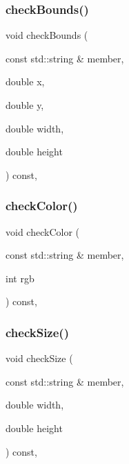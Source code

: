\subsubsection{\texorpdfstring{check\+Bounds()}{checkBounds()}}
{\footnotesize\ttfamily void check\+Bounds (\begin{DoxyParamCaption}\item[{const std\+::string \&}]{member,  }\item[{double}]{x,  }\item[{double}]{y,  }\item[{double}]{width,  }\item[{double}]{height }\end{DoxyParamCaption}) const\hspace{0.3cm}{\ttfamily [protected]}, {\ttfamily [inherited]}}

\mbox{\label{classGDrawingSurface_a9841b5dc607ca41a14819d80e1d8a09c}} 
\subsubsection{\texorpdfstring{check\+Color()}{checkColor()}}
{\footnotesize\ttfamily void check\+Color (\begin{DoxyParamCaption}\item[{const std\+::string \&}]{member,  }\item[{int}]{rgb }\end{DoxyParamCaption}) const\hspace{0.3cm}{\ttfamily [protected]}, {\ttfamily [inherited]}}

\mbox{\label{classGDrawingSurface_a70a6546707ae708573396616bd0f5320}} 
\subsubsection{\texorpdfstring{check\+Size()}{checkSize()}}
{\footnotesize\ttfamily void check\+Size (\begin{DoxyParamCaption}\item[{const std\+::string \&}]{member,  }\item[{double}]{width,  }\item[{double}]{height }\end{DoxyParamCaption}) const\hspace{0.3cm}{\ttfamily [protected]}, {\ttfamily [inherited]}}

